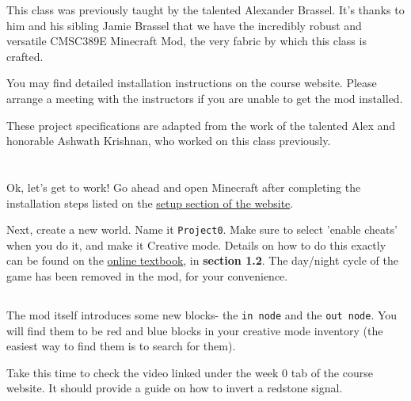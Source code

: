 \documentclass{article}
\begin{document}
This class was previously taught by the talented Alexander Brassel. It's thanks to him and his sibling Jamie Brassel that we have the incredibly robust and versatile CMSC389E Minecraft Mod, the very fabric by which this class is crafted. 

You may find detailed installation instructions on the course website. Please arrange a meeting with the instructors if you are unable to get the mod installed.

These project specifications are adapted from the work of the talented Alex and honorable Ashwath Krishnan, who worked on this class previously.

\section{\selectfont{The First Project!}}

Ok, let's get to work! Go ahead and open Minecraft after completing the installation steps listed on the \href{https://cmsc-389e.github.io/setup.html}{setup section of the website}.

Next, create a new world. Name it \texttt{Project0}. Make sure to select 'enable cheats' when you do it, and make it Creative mode. Details on how to do this exactly can be found on the \href{https://cmsc-389e.github.io/digital-logic-computer-architecture-minecraft/index.html}{online textbook}, in \textbf{section 1.2}. The day/night cycle of the game has been removed in the mod, for your convenience.

\subsection{\selectfont{New Blocks}}

The mod itself introduces some new blocks- the \texttt{in node} and the \texttt{out node}. You will find them to be red and blue blocks in your creative mode inventory (the easiest way to find them is to search for them).

Take this time to check the video linked under the week 0 tab of the course website. It should provide a guide on how to invert a redstone signal.

\subsection{\selectfont{What to Build}}
\end{document}
